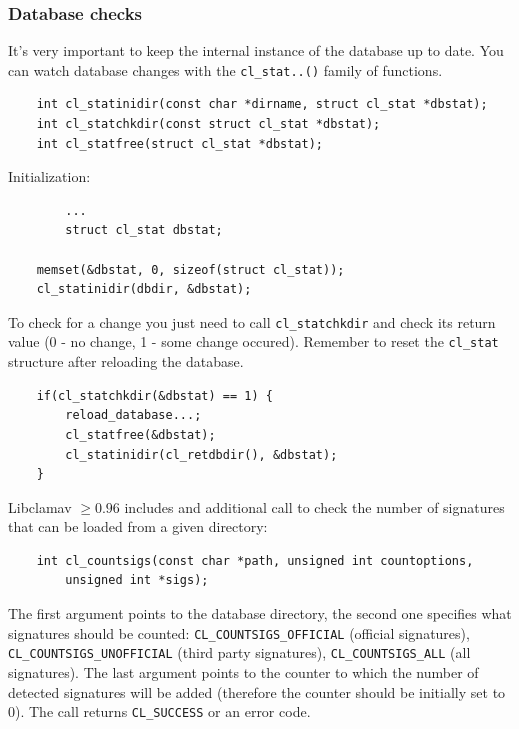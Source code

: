 \documentclass[a4paper,titlepage,12pt]{article}
\begin{document}
    \subsubsection{Database checks}
    It's very important  to keep the internal instance of the database up to
    date. You can watch database changes with the \verb+cl_stat..()+ family
    of functions.
    \begin{verbatim}
	int cl_statinidir(const char *dirname, struct cl_stat *dbstat);
	int cl_statchkdir(const struct cl_stat *dbstat);
	int cl_statfree(struct cl_stat *dbstat);
    \end{verbatim}
    Initialization:
    \begin{verbatim}
	    ...
	    struct cl_stat dbstat;

	memset(&dbstat, 0, sizeof(struct cl_stat));
	cl_statinidir(dbdir, &dbstat);
    \end{verbatim}
    To check for a change you just need to call \verb+cl_statchkdir+ and check
    its return value (0 - no change, 1 - some change occured). Remember to reset
    the \verb+cl_stat+ structure after reloading the database.
    \begin{verbatim}
	if(cl_statchkdir(&dbstat) == 1) {
	    reload_database...;
	    cl_statfree(&dbstat);
	    cl_statinidir(cl_retdbdir(), &dbstat);
	}
    \end{verbatim}
    Libclamav $\ge0.96$ includes and additional call to check the number of
    signatures that can be loaded from a given directory:
    \begin{verbatim}
	int cl_countsigs(const char *path, unsigned int countoptions,
	    unsigned int *sigs);
    \end{verbatim}
    The first argument points to the database directory, the second one
    specifies what signatures should be counted:
    \verb+CL_COUNTSIGS_OFFICIAL+ (official signatures),\\
    \verb+CL_COUNTSIGS_UNOFFICIAL+ (third party signatures),
    \verb+CL_COUNTSIGS_ALL+ (all signatures). The last argument points
    to the counter to which the number of detected signatures will
    be added (therefore the counter should be initially set to 0).
    The call returns \verb+CL_SUCCESS+ or an error code.
\end{document}
